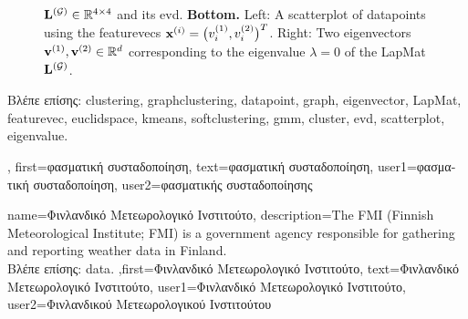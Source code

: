 {{\begin{figure}[H]
\begin{center}
{					${\bf L}^{(\mathcal{G})}  \in \mathbb{R}^{4 \times 4}$ and its \gls{evd}. 
					{\bf Bottom.} Left: A \gls{scatterplot} of \gls{datapoint}s using the \gls{featurevec}s 
					${\bf x}^{(i)} = \big( v^{(1)}_{i},v^{(2)}_{i} \big)^{T}$. 
					Right: Two \gls{eigenvector}s ${\bf v}^{(1)},{\bf v}^{(2)} \in \mathbb{R}^{d}$ 
					corresponding to the \gls{eigenvalue} $\lambda=0$ of the \gls{LapMat} ${\bf L}^{(\mathcal{G})}$. 
					} 
			\end{center}
		\end{figure}
	\newpage
	\foreignlanguage{greek}{Βλέπε επίσης:} \gls{clustering}, \gls{graphclustering}, \gls{datapoint}, \gls{graph}, \gls{eigenvector}, \gls{LapMat}, \gls{featurevec}, \gls{euclidspace}, \gls{kmeans}, \gls{softclustering}, \gls{gmm}, \gls{cluster}, \gls{evd}, \gls{scatterplot}, \gls{eigenvalue}.}, 
	first={\foreignlanguage{greek}{φασματική συσταδοποίηση}},
	text={\foreignlanguage{greek}{φασματική συσταδοποίηση}},
	user1={\foreignlanguage{greek}{φασματική συσταδοποίηση}}, %
    	user2={\foreignlanguage{greek}{φασματικής συσταδοποίησης}} %
}

{name={\foreignlanguage{greek}{Φινλανδικό Μετεωρολογικό Ινστιτούτο}}, 
	description={The
		FMI (Finnish Meteorological Institute; FMI) is a government agency responsible for gathering 
		and reporting weather \gls{data} in Finland.\\
		\foreignlanguage{greek}{Βλέπε επίσης:} \gls{data}.
		},first={\foreignlanguage{greek}{Φινλανδικό Μετεωρολογικό Ινστιτούτο}},
		text={\foreignlanguage{greek}{Φινλανδικό Μετεωρολογικό Ινστιτούτο}},
		user1={\foreignlanguage{greek}{Φινλανδικό Μετεωρολογικό Ινστιτούτο}}, %
		user2={\foreignlanguage{greek}{Φινλανδικού Μετεωρολογικού Ινστιτούτου}} %
}

